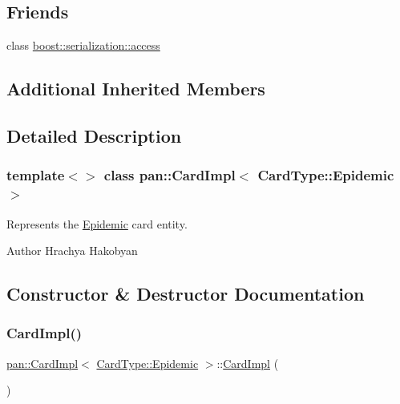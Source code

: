 \subsection*{Friends}
\begin{DoxyCompactItemize}
\item 
class \hyperlink{classpan_1_1_card_impl_3_01_card_type_1_1_epidemic_01_4_ac98d07dd8f7b70e16ccb9a01abf56b9c}{boost\+::serialization\+::access}
\end{DoxyCompactItemize}
\subsection*{Additional Inherited Members}


\subsection{Detailed Description}
\subsubsection*{template$<$$>$\newline
class pan\+::\+Card\+Impl$<$ Card\+Type\+::\+Epidemic $>$}

Represents the \hyperlink{classpan_1_1_epidemic}{Epidemic} card entity. 

\begin{DoxyAuthor}{Author}
Hrachya Hakobyan 
\end{DoxyAuthor}


\subsection{Constructor \& Destructor Documentation}
\mbox{\label{classpan_1_1_card_impl_3_01_card_type_1_1_epidemic_01_4_a19cabff4b96d1931e1ef0332c28eee92}} 
\subsubsection{\texorpdfstring{Card\+Impl()}{CardImpl()}}
{\footnotesize\ttfamily \hyperlink{classpan_1_1_card_impl}{pan\+::\+Card\+Impl}$<$ \hyperlink{namespacepan_a1f7350bfd0421afeabe9fa95c16fa811a62eff626cf0804badc417196cfd09a12}{Card\+Type\+::\+Epidemic} $>$\+::\hyperlink{classpan_1_1_card_impl}{Card\+Impl} (\begin{DoxyParamCaption}{ }\end{DoxyParamCaption})}

